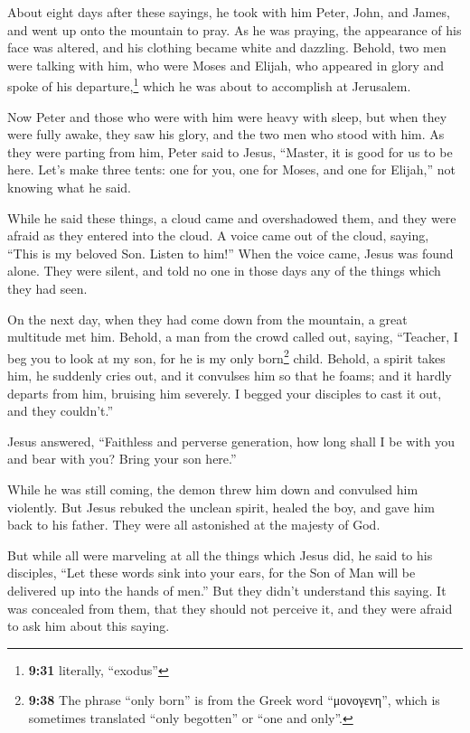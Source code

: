  About eight days after these sayings, he took with him
Peter, John, and James, and went up onto the mountain to pray.
 As he was praying, the appearance of his face was
altered, and his clothing became white and dazzling. 
Behold, two men were talking with him, who were Moses and Elijah,
 who appeared in glory and spoke of his
departure,\footnote{\textbf{9:31} literally, ``exodus''} which he was
about to accomplish at Jerusalem.

 Now Peter and those who were with him were heavy with
sleep, but when they were fully awake, they saw his glory, and the two
men who stood with him.  As they were parting from him,
Peter said to Jesus, ``Master, it is good for us to be here. Let's make
three tents: one for you, one for Moses, and one for Elijah,'' not
knowing what he said.

 While he said these things, a cloud came and
overshadowed them, and they were afraid as they entered into the cloud.
 A voice came out of the cloud, saying, ``This is my
beloved Son. Listen to him!''  When the voice came, Jesus
was found alone. They were silent, and told no one in those days any of
the things which they had seen.

 On the next day, when they had come down from the
mountain, a great multitude met him.  Behold, a man from
the crowd called out, saying, ``Teacher, I beg you to look at my son,
for he is my only born\footnote{\textbf{9:38} The phrase ``only born''
  is from the Greek word ``μονογενη'', which is sometimes translated
  ``only begotten'' or ``one and only''.} child.  Behold,
a spirit takes him, he suddenly cries out, and it convulses him so that
he foams; and it hardly departs from him, bruising him severely.
 I begged your disciples to cast it out, and they
couldn't.''

 Jesus answered, ``Faithless and perverse generation, how
long shall I be with you and bear with you? Bring your son here.''

 While he was still coming, the demon threw him down and
convulsed him violently. But Jesus rebuked the unclean spirit, healed
the boy, and gave him back to his father.  They were all
astonished at the majesty of God.

But while all were marveling at all the things which Jesus did, he said
to his disciples,  ``Let these words sink into your ears,
for the Son of Man will be delivered up into the hands of men.''
 But they didn't understand this saying. It was concealed
from them, that they should not perceive it, and they were afraid to ask
him about this saying.

